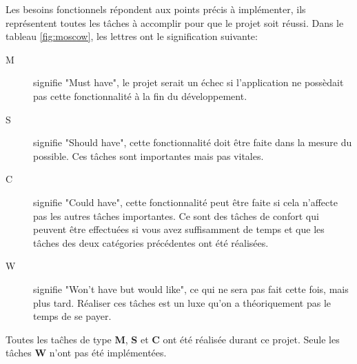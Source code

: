 \documentclass{EPL-master-thesis-covers-FR}
\begin{document}
			Les besoins fonctionnels répondent aux points précis à implémenter, ils représentent toutes les tâches à accomplir pour que le projet soit réussi. Dans le tableau \ref{fig:moscow}, les lettres ont le signification suivante: 
			\begin{description}
				\item[M] signifie "Must have", le projet serait un échec si l'application ne possèdait pas cette fonctionnalité à la fin du développement.
				\item[S] signifie "Should have", cette fonctionnalité doit être faite dans la mesure du possible. Ces tâches sont importantes mais pas vitales.
				\item[C] signifie "Could have", cette fonctionnalité peut être faite si cela n'affecte pas les autres tâches importantes. Ce sont des tâches de confort qui peuvent être effectuées si vous avez suffisamment de temps et que les tâches des deux catégories précédentes ont été réalisées.
				\item[W] signifie "Won't have but would like", ce qui ne sera pas fait cette fois, mais plus tard. Réaliser ces tâches est un luxe qu'on a théoriquement pas le temps de se payer.
			\end{description}
			
			Toutes les taĉhes de type \textbf{M}, \textbf{S} et \textbf{C} ont été réalisée durant ce projet. Seule les tâches \textbf{W} n'ont pas été implémentées.
			
\end{document}
